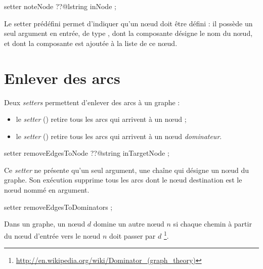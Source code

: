 
\begin{galgascode}
setter noteNode ??@lstring inNode ;
\end{galgascode}

Le setter prédéfini  permet d'indiquer qu'un nœud doit être défini : il possède un seul argument en entrée, de type , dont la composante  désigne le nom du nœud, et dont la composante  est ajoutée à la liste de ce nœud.



\section{Enlever des arcs}

Deux \emph{setters} permettent d'enlever des arcs à un graphe :
\begin{itemize}
  \item le \emph{setter}  () retire tous les arcs qui arrivent à un nœud ;
  \item le \emph{setter}  () retire tous les arcs qui arrivent à un nœud \emph{dominateur}.
\end{itemize}




\begin{galgascode}
setter removeEdgesToNode ??@string inTargetNode ;
\end{galgascode}

Ce \emph{setter} ne présente qu'un seul argument, une chaîne qui désigne un nœud du graphe. Son exécution supprime tous les arcs dont le nœud destination est le nœud nommé en argument.


\begin{galgascode}
setter removeEdgesToDominators ;
\end{galgascode}

Dans un graphe, un nœud $d$ domine un autre nœud $n$ si chaque chemin à partir du nœud d'entrée vers le nœud $n$ doit passer par $d$ \footnote{\url{http://en.wikipedia.org/wiki/Dominator_(graph_theory)}}.

